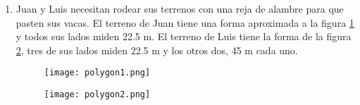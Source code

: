 \begin{enumerate}
    \item Juan y Luis necesitan rodear sus terrenos con una reja de alambre para que pasten
          sus vacas. El terreno de Juan tiene una forma aproximada a la figura \ref{fig:polygon1} y todos sus
          lados miden 22.5 m. El terreno de Luis tiene la forma de la figura \ref{fig:polygon2}, tres de sus
          lados miden 22.5 m y los otros dos, 45 m cada uno.

          \begin{minipage}{0.45\textwidth}
              \begin{figure}[H]
                  \centering
                  \texttt{[image: polygon1.png]}
                  \label{fig:polygon1}
              \end{figure}
          \end{minipage}\hfill
          \begin{minipage}{0.45\textwidth}
              \begin{figure}[H]
                  \centering
                  \texttt{[image: polygon2.png]}
                  \label{fig:polygon2}
              \end{figure}
          \end{minipage}


\end{enumerate}
